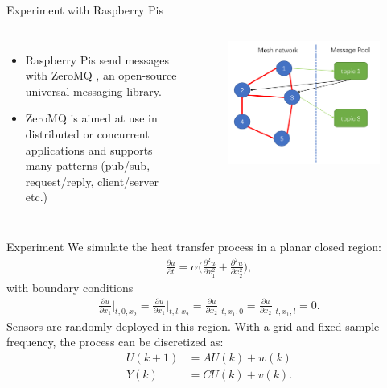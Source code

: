 \documentclass[10pt]{beamer}
\DeclareMathOperator{\1}{\textbf{1}}
\begin{document}
	      \begin{frame}{Experiment with Raspberry Pis}
		\begin{columns}[c]
		  \column{7cm}
		  \begin{itemize}
		    \item Raspberry Pis send messages with ZeroMQ \cite{ZeroMQ}, an open-source universal messaging library.
		    \item ZeroMQ is aimed at use in distributed or concurrent applications and supports many patterns (pub/sub, request/reply, client/server etc.)
		  \end{itemize}
		  \column{5cm}
		  \begin{figure}
		    \centering
		    \includegraphics[width=1\textwidth]{pic/msg.png}
		  \end{figure}
		\end{columns}
	      \end{frame}

	      \begin{frame}{Experiment}
		We simulate the heat transfer process in a planar closed region:
		\begin{align*}
		  \frac{\partial u}{\partial t}=\alpha\Big(\frac{\partial^2u}{\partial x_1^2}+\frac{\partial^2u}{\partial x_2^2}\Big),
		\end{align*}
		with boundary conditions
		\begin{align*}
		  \frac{\partial u}{\partial x_1}\Big|_{t,0,x_2}=\frac{\partial u}{\partial x_1}\Big|_{t,l,x_2}=\frac{\partial u}{\partial x_2}\Big|_{t,x_1,0}=\frac{\partial u}{\partial x_2}\Big|_{t,x_1,l}=0.
		\end{align*}
		Sensors are randomly deployed in this region. With a grid and fixed sample frequency, the process can be discretized as:
		\begin{align*}
		  U(k+1)&=AU(k)+w(k)\\
		  Y(k)&=CU(k)+v(k).
		\end{align*}
	      \end{frame}
\end{document}

